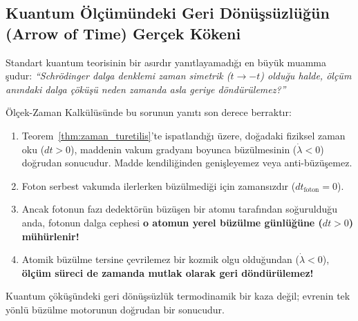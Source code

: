 \subsection{Kuantum Ölçümündeki Geri Dönüşsüzlüğün (Arrow of Time) Gerçek Kökeni}
\label{sec:geri_donussuzluk_zamani}

Standart kuantum teorisinin bir asırdır yanıtlayamadığı en büyük muamma şudur: \textit{``Schrödinger dalga denklemi zaman simetrik ($t \to -t$) olduğu halde, ölçüm anındaki dalga çöküşü neden zamanda asla geriye döndürülemez?''}

Ölçek-Zaman Kalkülüsünde bu sorunun yanıtı son derece berraktır:
\begin{enumerate}
    \item Teorem~\ref{thm:zaman_turetilis}'te ispatlandığı üzere, doğadaki fiziksel zaman oku ($dt > 0$), maddenin vakum gradyanı boyunca büzülmesinin ($\dot{\lambda} < 0$) doğrudan sonucudur. Madde kendiliğinden genişleyemez veya anti-büzüşemez.
    \item Foton serbest vakumda ilerlerken büzülmediği için zamansızdır ($dt_{\mathrm{foton}} = 0$).
    \item Ancak fotonun fazı dedektörün büzüşen bir atomu tarafından soğurulduğu anda, fotonun dalga cephesi \textbf{o atomun yerel büzülme günlüğüne ($dt > 0$) mühürlenir!}
    \item Atomik büzülme tersine çevrilemez bir kozmik olgu olduğundan ($\dot{\lambda} < 0$), \textbf{ölçüm süreci de zamanda mutlak olarak geri döndürülemez!}
\end{enumerate}
Kuantum çöküşündeki geri dönüşsüzlük termodinamik bir kaza değil; evrenin tek yönlü büzülme motorunun doğrudan bir sonucudur.

